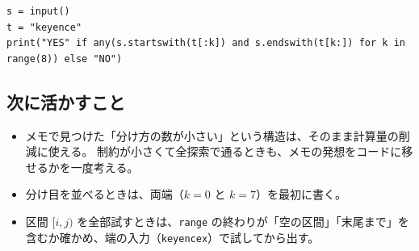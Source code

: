 \documentclass[a4paper]{article}
\begin{document}
\begin{verbatim}
s = input()
t = "keyence"
print("YES" if any(s.startswith(t[:k]) and s.endswith(t[k:]) for k in range(8)) else "NO")
\end{verbatim}

\subsection*{次に活かすこと}
\begin{itemize}
  \item メモで見つけた「分け方の数が小さい」という構造は、そのまま計算量の削減に使える。
    制約が小さくて全探索で通るときも、メモの発想をコードに移せるかを一度考える。
  \item 分け目を並べるときは、両端（$k=0$ と $k=7$）を最初に書く。
  \item 区間 $[i,j)$ を全部試すときは、\verb|range| の終わりが「空の区間」「末尾まで」を含むか確かめ、端の入力（\verb|keyencex|）で試してから出す。
\end{itemize}
\end{document}
